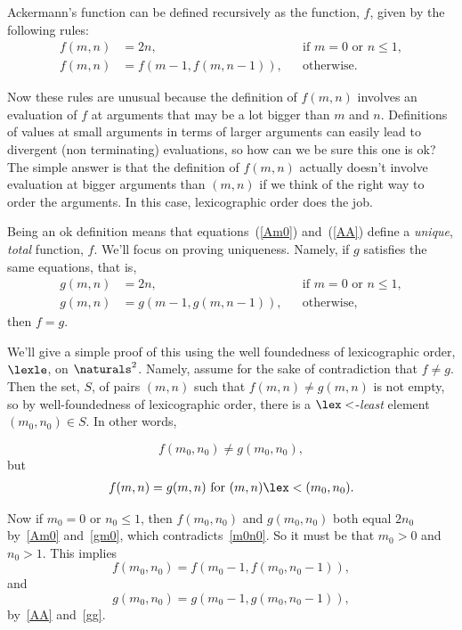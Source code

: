 Ackermann's function can be defined recursively as the function, $f$,
given by the following rules:
\begin{align}
f(m,n) &=  2n, &&\text{if $m=0$ or $n \le 1$},\label{Am0}\\ 
f(m,n) &=  f(m-1,f(m,n-1)), &&\text{otherwise}.\label{AA}
\end{align}

Now these rules are unusual because the definition of $f(m,n)$ involves an
evaluation of $f$ at arguments that may be a lot bigger than $m$ and $n$.
Definitions of values at small arguments in terms of larger arguments can
easily lead to divergent (non terminating) evaluations, so how can we be
sure this one is ok?  The simple answer is that the definition of $f(m,n)$
actually doesn't involve evaluation at bigger arguments than $(m,n)$ if we
think of the right way to order the arguments.  In this case,
lexicographic order does the job.

Being an ok definition means that equations~(\ref{Am0}) and~(\ref{AA})
define a \emph{unique}, \emph{total} function, $f$.  We'll focus on
proving uniqueness.  Namely, if $g$ satisfies the same equations, that is,
\begin{align}
g(m,n) &=  2n, &&\text{if $m=0$ or $n \le 1$},\label{gm0}\\ 
g(m,n) &=  g(m-1,g(m,n-1)), &&\text{otherwise},\label{gg}
\end{align}
then $f=g$.

We'll give a simple proof of this using the well foundedness of
lexicographic order, $\lexle$, on $\naturals^2$.  Namely, assume for the
sake of contradiction that $f \neq g$.  Then the set, $S$, of pairs
$(m,n)$ such that $f(m,n) \ne g(m,n)$ is not empty, so by well-foundedness
of lexicographic order, there is a $\lex<$-\emph{least} element $(m_0,n_0)
\in S$.  In other words,

\begin{equation}\label{m0n0}
f(m_0,n_0) \neq g(m_0,n_0),
\end{equation}
but
\begin{eqnarray}\label{<m0n0}
f(m,n) = g(m,n) \text{ for } (m,n) \lex< (m_0,n_0).
\end{eqnarray}

Now if $m_0 = 0$ or $n_0 \le 1$, then $f(m_0,n_0)$ and $g(m_0,n_0)$ both
equal $2n_0$ by~\eqref{Am0} and~\eqref{gm0}, which
contradicts~\eqref{m0n0}.  So it must be that $m_0 >0$ and $n_0 > 1$.
This implies
\begin{equation}\label{fm0f}
f(m_0,n_0) = f(m_0-1,f(m_0,n_0-1)),
\end{equation}
and
\begin{equation}\label{gm0g}
g(m_0,n_0) = g(m_0-1,g(m_0,n_0-1)),
\end{equation}
by~\eqref{AA} and~\eqref{gg}.

